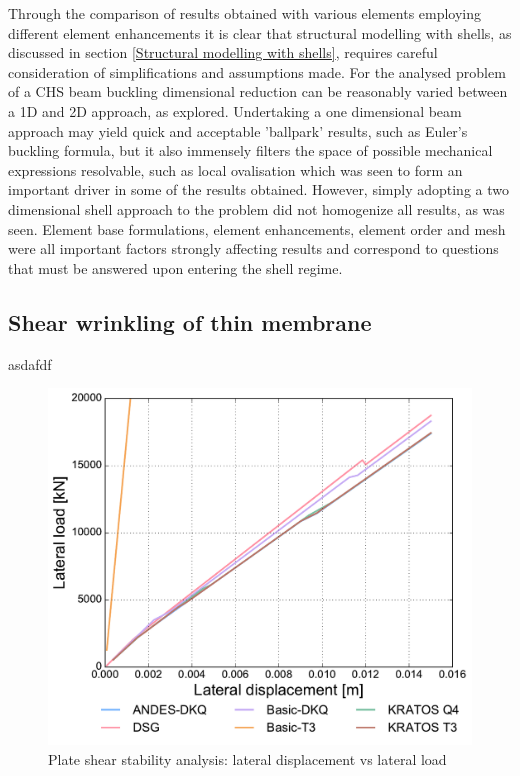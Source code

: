 Through the comparison of results obtained with various elements employing different element enhancements it is clear that structural modelling with shells, as discussed in section \ref{Structural modelling with shells}, requires careful consideration of simplifications and assumptions made. For the analysed problem of a CHS beam buckling dimensional reduction can be reasonably varied between a 1D and 2D approach, as explored. Undertaking a one dimensional beam approach may yield quick and acceptable 'ballpark' results, such as Euler's buckling formula, but it also immensely filters the space of possible mechanical expressions resolvable, such as local ovalisation which was seen to form an important driver in some of the results obtained. However, simply adopting a two dimensional shell approach to the problem did not homogenize all results, as was seen. Element base formulations, element enhancements, element order and mesh were all important factors strongly affecting results and correspond to questions that must be answered upon entering the shell regime. 

\subsection{Shear wrinkling of thin membrane}

asdafdf

\begin{figure}[H]
	\centering
	\def\svgwidth{\columnwidth}
	\includegraphics[width=12cm]{images/stability_wrinkle_axial_disp.pdf}
	\caption{Plate shear stability analysis: lateral displacement vs lateral load}
	\label{pic:wrinkle1}
\end{figure}


